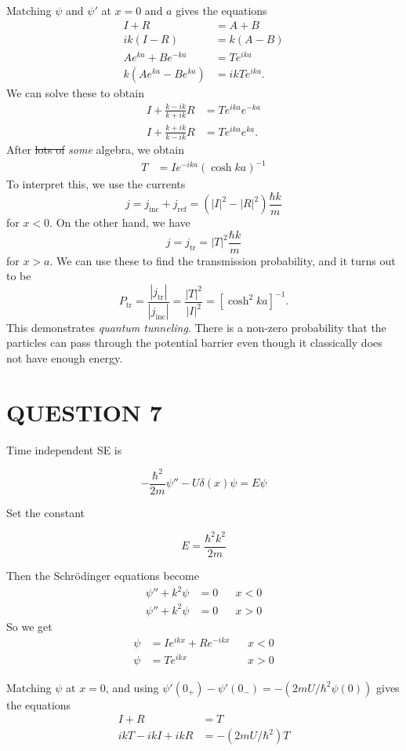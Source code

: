 \documentclass[a4paper]{article}
\begin{document}
Matching $\psi$ and $\psi'$ at $x = 0$ and $a$ gives the equations
\begin{align*}
I + R &= A + B\\
ik(I - R) &= k (A - B)\\
A e^{k a} + Be^{- k a} &= Te^{ika}\\
k(Ae^{k a} - Be^{k a}) &= ik Te^{ika}.
\end{align*}
We can solve these to obtain
\begin{align*}
I + \frac{k - ik}{k + ik}R &= Te^{ika} e^{-k a}\\
I + \frac{k + ik}{k - ik}R &= Te^{ika} e^{k a}.
\end{align*}
After \st{lots of} \emph{some} algebra, we obtain
\begin{align*}
T &= I e^{-ika}\left(\cosh k a\right)^{-1}
\end{align*}
To interpret this, we use the currents
\[
j = j_{\mathrm{inc}} + j_{\mathrm{ref}} = (|I|^2 - |R|^2) \frac{\hbar k}{m}
\]
for $x < 0$. On the other hand, we have
\[
j = j_{\mathrm{tr}} = |T|^2 \frac{\hbar k}{m}
\]
for $x > a$. We can use these to find the transmission probability, and it turns out to be
\[
P_{\mathrm{tr}} = \frac{|j_{\mathrm{tr}}|}{|j_{\mathrm{inc}}|} = \frac{|T|^2}{|I|^2} = \left[ \cosh^{2} ka \right]^{-1}.
\]
This demonstrates \emph{quantum tunneling}. There is a non-zero probability that the particles can pass through the potential barrier even though it classically does not have enough energy.

\section{QUESTION 7}


Time independent SE is 

\[ - \frac{\hbar^{2}}{2m} \psi'' - U \delta(x) \psi = E \psi  \]

Set the constant

\[
E = \frac{\hbar^2 k^2}{2m}
\]

Then the Schr\"odinger equations become
\begin{align*}
\psi'' + k^2 \psi &= 0 && x < 0\\
\psi'' + k^2 \psi &= 0 && x > 0
\end{align*}
So we get
\begin{align*}
\psi &= I e^{ikx} + Re^{-ikx}&& x < 0\\
\psi &= Te^{ikx} && x > 0
\end{align*}

Matching $\psi$ at $x = 0$, and using $ \psi'(0_{+}) - \psi'(0_{-})  = - (2mU / \hbar^{2} \psi(0))$  gives the equations
\begin{align*}
I + R &= T\\
i k T - ikI + ikR & = - (2mU / \hbar^{2})T
\end{align*}
\end{document}
